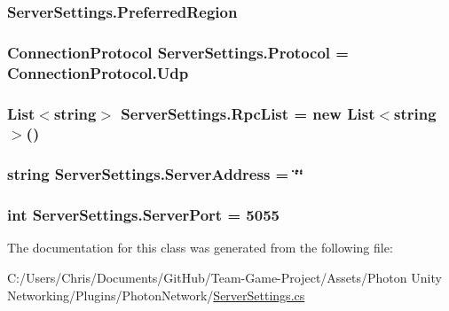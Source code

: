 \subsubsection[{\texorpdfstring{Preferred\+Region}{PreferredRegion}}]{ Server\+Settings.\+Preferred\+Region}\hypertarget{class_server_settings_a3b8285422f8ec14b98457c0935304b6d}{}\label{class_server_settings_a3b8285422f8ec14b98457c0935304b6d}
\subsubsection[{\texorpdfstring{Protocol}{Protocol}}]{\setlength{\rightskip}{0pt plus 5cm}Connection\+Protocol Server\+Settings.\+Protocol = Connection\+Protocol.\+Udp}\hypertarget{class_server_settings_a2fafc5c45a737f8090fef92f080bfd50}{}\label{class_server_settings_a2fafc5c45a737f8090fef92f080bfd50}
\subsubsection[{\texorpdfstring{Rpc\+List}{RpcList}}]{\setlength{\rightskip}{0pt plus 5cm}List$<$string$>$ Server\+Settings.\+Rpc\+List = new List$<$string$>$()}\hypertarget{class_server_settings_abe34064564018fc67afae2142c244cba}{}\label{class_server_settings_abe34064564018fc67afae2142c244cba}
\subsubsection[{\texorpdfstring{Server\+Address}{ServerAddress}}]{\setlength{\rightskip}{0pt plus 5cm}string Server\+Settings.\+Server\+Address = \char`\"{}\char`\"{}}\hypertarget{class_server_settings_ac93d5ddacf54f0efb974bb3c57537275}{}\label{class_server_settings_ac93d5ddacf54f0efb974bb3c57537275}
\subsubsection[{\texorpdfstring{Server\+Port}{ServerPort}}]{\setlength{\rightskip}{0pt plus 5cm}int Server\+Settings.\+Server\+Port = 5055}\hypertarget{class_server_settings_a61d571180623076b8a12b9d2ca550411}{}\label{class_server_settings_a61d571180623076b8a12b9d2ca550411}


The documentation for this class was generated from the following file\+:\begin{DoxyCompactItemize}
\item 
C\+:/\+Users/\+Chris/\+Documents/\+Git\+Hub/\+Team-\/\+Game-\/\+Project/\+Assets/\+Photon Unity Networking/\+Plugins/\+Photon\+Network/\hyperlink{_server_settings_8cs}{Server\+Settings.\+cs}\end{DoxyCompactItemize}
